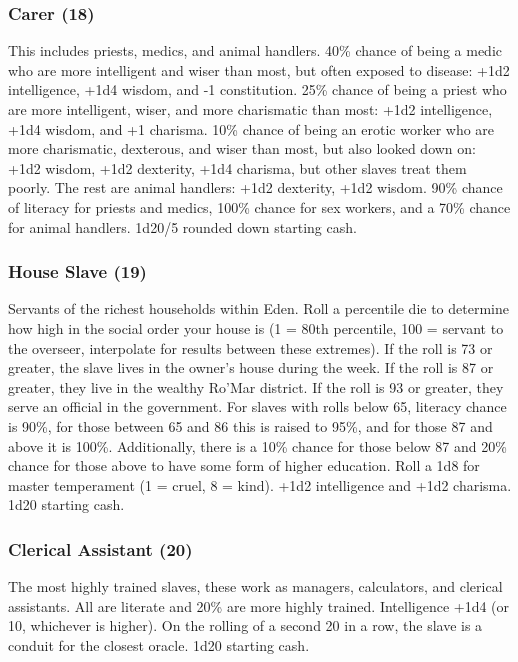 \documentclass[letterpaper,12pt]{article}
\begin{document}
\subsubsection{Carer (18)}
This includes priests, medics, and animal handlers. 40\% chance of being a medic who are more intelligent and wiser than most, but often exposed to disease: +1d2 intelligence, +1d4 wisdom, and -1 constitution. 25\% chance of being a priest who are more intelligent, wiser, and more charismatic than most: +1d2 intelligence, +1d4 wisdom, and +1 charisma. 10\% chance of being an erotic worker who are more charismatic, dexterous, and wiser than most, but also looked down on: +1d2 wisdom, +1d2 dexterity, +1d4 charisma, but other slaves treat them poorly. The rest are animal handlers: +1d2 dexterity, +1d2 wisdom. 90\% chance of literacy for priests and medics, 100\% chance for sex workers, and a 70\% chance for animal handlers. 1d20/5 rounded down starting cash.

\subsubsection{House Slave (19)}
Servants of the richest households within Eden. Roll a percentile die to determine how high in the social order your house is (1 = 80th percentile, 100 = servant to the overseer, interpolate for results between these extremes). If the roll is 73 or greater, the slave lives in the owner's house during the week. If the roll is 87 or greater, they live in the wealthy Ro'Mar district. If the roll is 93 or greater, they serve an official in the government. For slaves with rolls below 65, literacy chance is 90\%, for those between 65 and 86 this is raised to 95\%, and for those 87 and above it is 100\%. Additionally, there is a 10\% chance for those below 87 and 20\% chance for those above to have some form of higher education. Roll a 1d8 for master temperament (1 = cruel, 8 = kind). +1d2 intelligence and +1d2 charisma. 1d20 starting cash.

\subsubsection{Clerical Assistant (20)}
The most highly trained slaves, these work as managers, calculators, and clerical assistants. All are literate and 20\% are more highly trained. Intelligence +1d4 (or 10, whichever is higher). On the rolling of a second 20 in a row, the slave is a conduit for the closest oracle. 1d20 starting cash.
\end{document}
